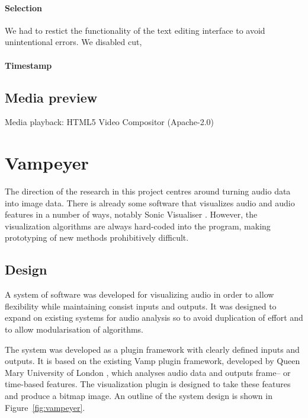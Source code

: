 \paragraph{Selection}


We had to restict the functionality of the text editing
interface to avoid unintentional errors. We disabled cut,

\paragraph{Timestamp}



\subsection{Media preview}
Media playback: HTML5 Video Compositor (Apache-2.0)

\clearpage
\section{Vampeyer}\label{sec:vampeyer}
The direction of the research in this project centres around turning audio data into image data. There is already some
software that visualizes audio and audio features in a number of ways, notably Sonic Visualiser \citep{Cannam2010}.
However, the visualization algorithms are always hard-coded into the program, making prototyping of new methods
prohibitively difficult.

\subsection{Design}
A system of software was developed for visualizing audio in order to allow flexibility while maintaining consist inputs
and outputs. It was designed to expand on existing systems for audio analysis so to avoid duplication of effort and to
allow modularisation of algorithms.

The system was developed as a plugin framework with clearly defined inputs and outputs. It is based on the existing
Vamp plugin framework, developed by Queen Mary University of London \citep{Cannam2010}, which analyses audio data and
outputs frame-- or time-based features. The visualization plugin is designed to take these features and produce a
bitmap image. An outline of the system design is shown in Figure~\ref{fig:vampeyer}.

